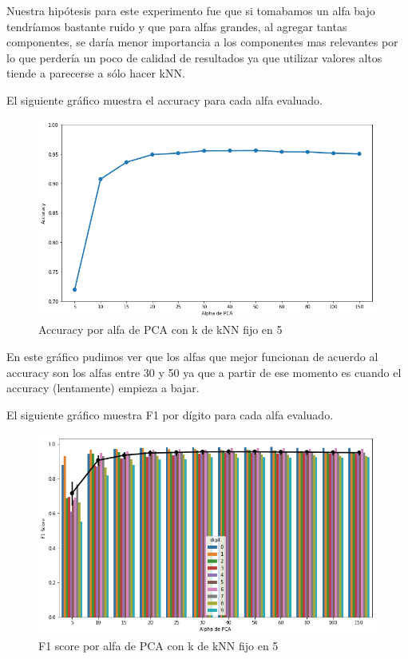 Nuestra hipótesis para este experimento fue que si tomabamos un alfa bajo tendríamos bastante ruido y que para alfas grandes, al agregar tantas componentes, se daría menor importancia a los componentes mas relevantes por lo que perdería un poco de calidad de resultados ya que utilizar valores altos tiende a parecerse a sólo hacer kNN.

El siguiente gráfico muestra el accuracy para cada alfa evaluado.

\begin{figure}[H]
    \begin{center}
      \includegraphics[width=0.8\columnwidth]{imagenes/Accuracy_all_alpha.png}
      \caption{Accuracy por alfa de PCA con k de kNN fijo en 5}
    \end{center}
\end{figure}

En este gráfico pudimos ver que los alfas que mejor funcionan de acuerdo al accuracy son los alfas entre 30 y 50 ya que a partir de ese momento es cuando el accuracy (lentamente) empieza a bajar.

El siguiente gráfico muestra F1 por dígito para cada alfa evaluado.

\begin{figure}[H]
    \begin{center}
      \includegraphics[width=0.8\columnwidth]{imagenes/F1_per_digit.png}
      \caption{F1 score por alfa de PCA con k de kNN fijo en 5}
    \end{center}
\end{figure}

